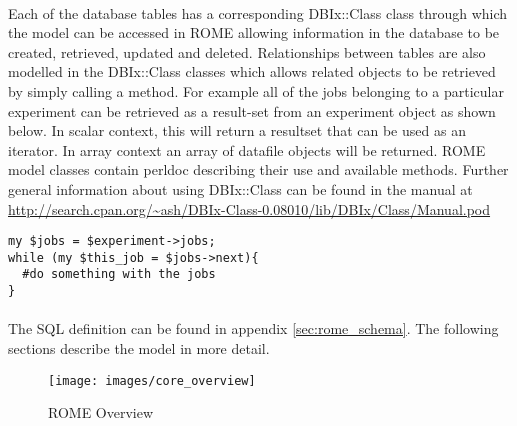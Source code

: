 
\paragraph{}
Each of the database tables has a corresponding DBIx::Class class through which the model can be accessed in ROME allowing information in the database to be created, retrieved, updated and deleted. Relationships between tables are also modelled in the DBIx::Class classes which allows related objects to be retrieved by simply calling a method. For example all of the jobs belonging to a particular experiment can be retrieved as a result-set from an experiment object as shown below. In scalar context, this will return a resultset that can be used as an iterator. In array context an array of datafile objects will be returned. ROME model classes contain perldoc describing their use and available methods. Further general information about using DBIx::Class can be found in the manual at \url{http://search.cpan.org/~ash/DBIx-Class-0.08010/lib/DBIx/Class/Manual.pod}

\begin{scriptsize}
\begin{verbatim}
my $jobs = $experiment->jobs;
while (my $this_job = $jobs->next){
  #do something with the jobs
}
\end{verbatim}
\end{scriptsize}



\paragraph{}
The SQL definition can be found in appendix \ref{sec:rome_schema}. The following sections describe the model in more detail.


\begin{figure}
\centering
\caption{ROME Overview}\label{fig:modover}
\texttt{[image: images/core\_overview]}
\end{figure}


